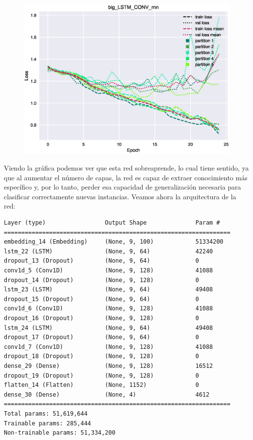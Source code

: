 \documentclass[11pt]{article}
\begin{document}
\begin{figure}[H]
\includegraphics[width=\linewidth]{images/loss/big_LSTM_CONV_rnn-1554209955.eps}
\end{figure}

Viendo la gráfica podemos ver que esta red sobreaprende, lo cual tiene sentido, ya que al aumentar el número de capas, la red es capaz de extraer conocimiento más específico y, por lo tanto, perder esa capacidad de generalización necesaria para clasificar correctamente nuevas instancias. Veamos ahora la arquitectura de la red:

\begin{verbatim}
Layer (type)                 Output Shape              Param #   
=================================================================
embedding_14 (Embedding)     (None, 9, 100)            51334200  
lstm_22 (LSTM)               (None, 9, 64)             42240     
dropout_13 (Dropout)         (None, 9, 64)             0         
conv1d_5 (Conv1D)            (None, 9, 128)            41088     
dropout_14 (Dropout)         (None, 9, 128)            0         
lstm_23 (LSTM)               (None, 9, 64)             49408     
dropout_15 (Dropout)         (None, 9, 64)             0         
conv1d_6 (Conv1D)            (None, 9, 128)            41088     
dropout_16 (Dropout)         (None, 9, 128)            0         
lstm_24 (LSTM)               (None, 9, 64)             49408     
dropout_17 (Dropout)         (None, 9, 64)             0         
conv1d_7 (Conv1D)            (None, 9, 128)            41088     
dropout_18 (Dropout)         (None, 9, 128)            0         
dense_29 (Dense)             (None, 9, 128)            16512     
dropout_19 (Dropout)         (None, 9, 128)            0         
flatten_14 (Flatten)         (None, 1152)              0         
dense_30 (Dense)             (None, 4)                 4612      
=================================================================
Total params: 51,619,644
Trainable params: 285,444
Non-trainable params: 51,334,200
\end{verbatim}
\end{document}
